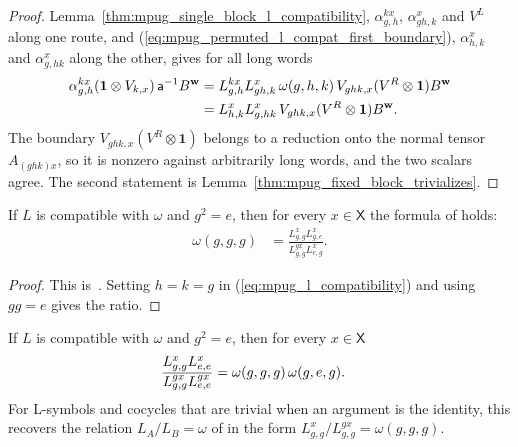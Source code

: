 \begin{proof}
    Lemma~\ref{thm:mpug_single_block_l_compatibility}, $\alpha^{kx}_{g,h}$,
    $\alpha^x_{gh,k}$ and $V^L$ along one route, and
    (\ref{eq:mpug_permuted_l_compat_first_boundary}), $\alpha^x_{h,k}$ and
    $\alpha^x_{g,hk}$ along the other, gives for all long words
    \begin{align}
        \alpha^{kx}_{g,h}(\mathbf 1\otimes V_{k,x})\,\mathsf a^{-1}B^{\mathbf w}
         & =L^{kx}_{g,h}L^x_{gh,k}\,\omega(g,h,k)\,
        V_{ghk,x}(V^R\otimes\mathbf 1)B^{\mathbf w}
        \notag                                                                \\
         & =L^x_{h,k}L^x_{g,hk}\,V_{ghk,x}(V^R\otimes\mathbf 1)B^{\mathbf w}.
        \notag
    \end{align}
    The boundary $V_{ghk,x}(V^R\otimes\mathbf 1)$ belongs to a reduction onto
    the normal tensor $A_{(ghk)x}$, so it is nonzero against arbitrarily long
    words, and the two scalars agree. The second statement is
    Lemma~\ref{thm:mpug_fixed_block_trivializes}.
\end{proof}

\begin{lemma}
    \label{thm:mpug_involution_anomaly_ratio}
    \leanok
    If $L$ is compatible with $\omega$ and $g^2=e$, then for every
    $x\in\mathsf X$ the formula of
    \cite[line~5121]{FrancoRubio2025MPUGauging} holds:
    \begin{align}
        \omega(g,g,g)
         & =\frac{L^x_{g,g}L^x_{g,e}}{L^{gx}_{g,g}L^x_{e,g}}.
    \end{align}
\end{lemma}

\begin{proof}\leanok
    This is~\cite[``The anomaly at an involution'']{QICLean2026Blueprint}.
    Setting $h=k=g$ in (\ref{eq:mpug_l_compatibility}) and using $gg=e$
    gives the ratio.
\end{proof}

\begin{lemma}
    \label{thm:mpug_involution_anomaly_identity_ratio}
    \leanok
    If $L$ is compatible with $\omega$ and $g^2=e$, then for every
    $x\in\mathsf X$
    \begin{align}
        \frac{L^x_{g,g}L^x_{e,e}}{L^{gx}_{g,g}L^{gx}_{e,e}}
         & =\omega(g,g,g)\,\omega(g,e,g).
        \notag
    \end{align}
    For L-symbols and cocycles that are trivial when an argument is the
    identity, this recovers the relation $L_A/L_B=\omega$ of
    \cite[Section~III.C]{GarreRubioSchuch2024DomainWall} in the form
    $L^x_{g,g}/L^{gx}_{g,g}=\omega(g,g,g)$.
\end{lemma}

